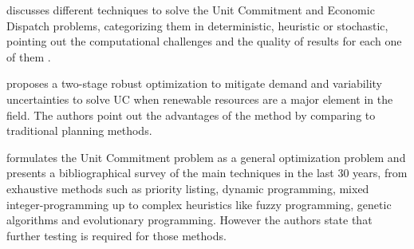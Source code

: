 \documentclass[12pt,LUDisStyle,twosided]{book}
\begin{document}
\begin{table}[h!]
\centering
\caption{Optimal Power Flow Categories.}
\end{table}


\citeauthor{yamin} \cite{yamin} discusses different techniques to solve the Unit Commitment and Economic Dispatch problems, categorizing them in deterministic, heuristic or stochastic, pointing out the computational challenges and the quality of results for each one of them . 

\citeauthor{bertsimas} \cite{bertsimas} proposes a two-stage robust optimization to mitigate demand and variability uncertainties to solve UC when renewable resources are a major element in the field. The authors point out the advantages of the method by comparing to traditional planning methods. 

\citeauthor{padhy} \cite{padhy} formulates the Unit Commitment problem as a general optimization problem and presents a bibliographical survey of the main techniques in the last 30 years, from exhaustive methods such as priority listing, dynamic programming, mixed integer-programming up to complex heuristics like fuzzy programming, genetic algorithms and evolutionary programming. However the authors state that further testing is required for those methods.
\end{document}
